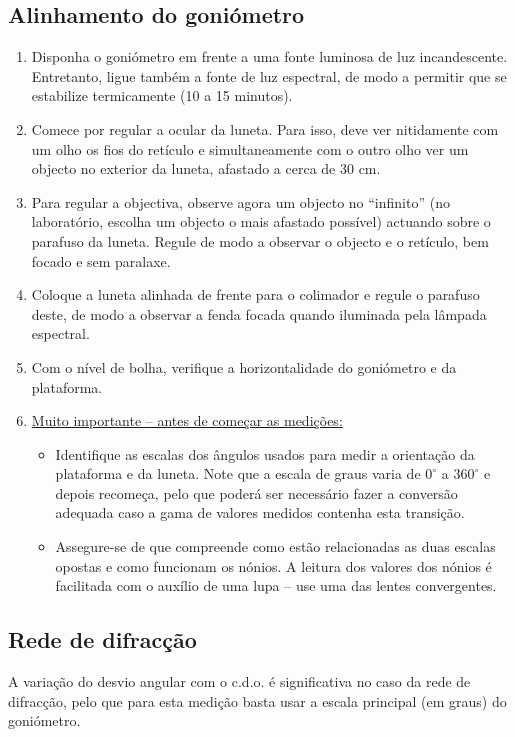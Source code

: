 \documentclass[a4paper,twoside,11pt]{report}      %
\begin{document}
\subsection*{\sf Alinhamento do goniómetro}
\begin{enumerate}
\item Disponha o goniómetro em frente a uma fonte luminosa de luz incandescente. Entretanto, ligue também a fonte de luz espectral, de modo a permitir que se estabilize termicamente (10 a 15 minutos).
\item Comece por regular a ocular da luneta. Para isso, deve ver nitidamente com um olho  os fios do retículo e simultaneamente com o outro olho ver um objecto no exterior da luneta, afastado a cerca de 30 cm.  
\item Para  regular  a  objectiva,  observe  agora  um  objecto  no  “infinito” (no  laboratório, escolha  um objecto o mais  afastado possível)  actuando  sobre  o  parafuso  da  luneta.  Regule  de  modo  a observar o objecto e o retículo, bem focado e sem paralaxe. 
\item Coloque  a  luneta  alinhada de frente  para o  colimador  e  regule o parafuso deste, de modo a observar a fenda focada quando iluminada pela lâmpada espectral. 
\item Com o nível de bolha, verifique a horizontalidade do goniómetro e da plataforma.
\item \underline{Muito importante -- antes de começar as medições:} 
\begin{itemize}
\item Identifique as escalas dos ângulos usados para medir a orientação da plataforma e da luneta. Note que a escala de graus varia de $0^\circ$ a $360^\circ$ e depois recomeça, pelo que poderá ser necessário fazer a conversão adequada caso a gama de valores medidos contenha esta transição. 
\item Assegure-se de que compreende como estão relacionadas as duas escalas opostas e como funcionam os nónios. A leitura dos valores dos nónios é facilitada com o auxílio de uma lupa -- use uma das lentes convergentes.
\end{itemize}
\end{enumerate}

\subsection*{\sf Rede de difracção}
A variação do desvio angular com o c.d.o. é significativa no caso da rede de difracção, pelo que para esta medição basta usar a escala principal (em graus) do goniómetro.
\end{document}

